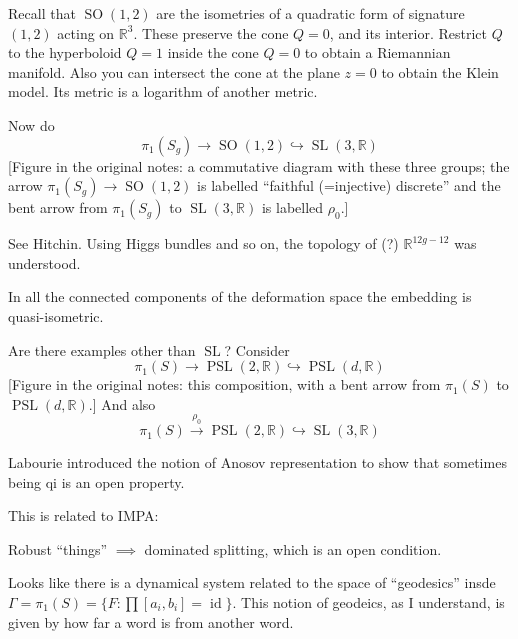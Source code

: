 \begin{example}
\label{example-potrie-hyperbolic-space}
Recall that $\operatorname{SO}(1,2)$ are the
isometries of a quadratic form of signature
$(1,2)$ acting on $\mathbb{R}^{3}$. These
preserve the cone $Q=0$, and its interior.
Restrict $Q$ to the hyperboloid $Q=1$ inside
the cone $Q=0$ to obtain a Riemannian
manifold. Also you can intersect the cone at
the plane $z=0$ to obtain the Klein model.
Its metric is a logarithm of another metric.

Now do
$$\pi_{1}(S_g)\to\operatorname{SO}(1,2)
\hookrightarrow
\operatorname{SL}(3,\mathbb{R})$$
[Figure in the original notes: a commutative
diagram with these three groups; the arrow
$\pi_{1}(S_g)\to\operatorname{SO}(1,2)$ is
labelled ``faithful (=injective) discrete''
and the bent arrow from $\pi_{1}(S_g)$ to
$\operatorname{SL}(3,\mathbb{R})$ is labelled
$\rho_0$.]

See Hitchin. Using Higgs bundles and so on,
the topology of (?) $\mathbb{R}^{12g-12}$ was
understood.
\end{example}

\begin{theorem}[Labourie]
\label{theorem-potrie-labourie}
In all the connected components of the
deformation space the embedding is
quasi-isometric.
\end{theorem}

\begin{remark}
\label{remark-potrie-misha-question}
Are there examples other than
$\operatorname{SL}$? Consider
$$\pi_{1}(S)\to\operatorname{PSL}(2,
\mathbb{R})\hookrightarrow
\operatorname{PSL}(d,\mathbb{R})$$
[Figure in the original notes: this
composition, with a bent arrow from
$\pi_{1}(S)$ to
$\operatorname{PSL}(d,\mathbb{R})$.]
And also
$$\pi_{1}(S)\xrightarrow{\rho_0}
\operatorname{PSL}(2,\mathbb{R})
\hookrightarrow
\operatorname{SL}(3,\mathbb{R})$$
\end{remark}

Labourie introduced the notion of Anosov
representation to show that sometimes being
qi is an open property.

This is related to IMPA:

\begin{theorem}
\label{theorem-potrie-mane-bdp}
Robust ``things'' $\implies $ dominated
splitting, which is an open condition.
\end{theorem}

Looks like there is a dynamical system
related to the space of ``geodesics'' insde
$\Gamma=\pi_{1}(S) =\{F:\prod
[a_i,b_i]=\operatorname{id} \}$. This notion
of geodeics, as I understand, is given by how
far a word is from another word.

